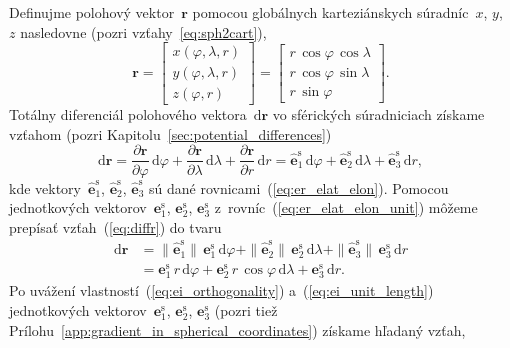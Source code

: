 \documentclass[a4paper,12pt]{book}
\newcommand{\diff}{\mathrm d}
\let\vec\mathbf
\begin{document}
Definujme polohový vektor~$\vec r$ pomocou globálnych karteziánskych 
súradníc~$x$, $y$, $z$ nasledovne (pozri vzťahy~\ref{eq:sph2cart}),
%
\begin{equation}
\vec r =
%
\begin{bmatrix}
x(\varphi, \lambda, r)\\
y(\varphi, \lambda, r)\\
z(\varphi, r)
\end{bmatrix}
%
=
%
\begin{bmatrix}
r \, \cos\varphi \, \cos\lambda\\
r \, \cos\varphi \, \sin\lambda\\
r \, \sin\varphi
\end{bmatrix}
%
{.}
\end{equation}
%
Totálny diferenciál polohového vektora~$\diff \vec r$ vo sférických 
súradniciach získame vzťahom (pozri Kapitolu~\ref{sec:potential_differences})
%
\begin{equation}
\label{eq:diffr}
\diff \vec r = \frac{\partial \vec r}{\partial \varphi} \, \diff \varphi 
+ \frac{\partial \vec r}{\partial \lambda} \, \diff \lambda + \frac{\partial 
\vec r}{\partial r} \, \diff r = \hat{\vec e}_1^\mathrm{s} \, \diff \varphi 
+ \hat{\vec e}_2^\mathrm{s} \, \diff \lambda + \hat{\vec e}_3^\mathrm{s} \, 
\diff r{,}
\end{equation}
%
kde vektory~$\hat{\vec e}_1^\mathrm{s}$, $\hat{\vec e}_2^\mathrm{s}$, 
$\hat{\vec e}_3^\mathrm{s}$ sú dané rovnicami~(\ref{eq:er_elat_elon}).  
Pomocou jednotkových vektorov~$\vec e_1^\mathrm{s}$, $\vec e_2^\mathrm{s}$, 
$\vec e_3^\mathrm{s}$ z~rovníc~(\ref{eq:er_elat_elon_unit}) môžeme prepísať 
vzťah~(\ref{eq:diffr}) do tvaru
%
\begin{equation}
\label{eq:diffr2}
\begin{split}
\diff \vec r &= \|\hat{\vec e}_1^\mathrm{s}\| \,\vec e_1^\mathrm{s} \, 
\diff\varphi + \|\hat{\vec e}_2^\mathrm{s}\| \, \vec e_2^\mathrm{s} \, 
\diff\lambda + \|\hat{\vec e}_3^\mathrm{s}\| \, \vec e_3^\mathrm{s} \, \diff 
r\\
%
&= \vec e_1^\mathrm{s} \, r \, \diff\varphi + \vec e_2^\mathrm{s} \, r \, 
\cos\varphi \, \diff\lambda + \vec e_3^\mathrm{s} \, \diff r{.}
\end{split}
\end{equation}
%
Po uvážení vlastností~(\ref{eq:ei_orthogonality}) a~(\ref{eq:ei_unit_length}) 
jednotkových vektorov~$\vec e_1^\mathrm{s}$, $\vec e_2^\mathrm{s}$, $\vec 
e_3^\mathrm{s}$ (pozri tiež 
Prílohu~\ref{app:gradient_in_spherical_coordinates}) získame hľadaný vzťah,
\end{document}
